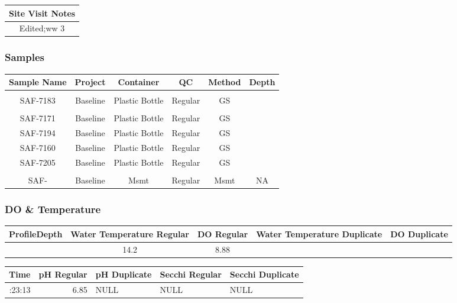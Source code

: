 \documentclass[
  letterpaper,
  DIV=11,
  numbers=noendperiod]{scrartcl}
\begin{document}
\begin{longtable*}{c}
\toprule
Site Visit Notes \\ 
\midrule\addlinespace[2.5pt]
Edited;ww 3 \\ 
\bottomrule
\end{longtable*}

\subsubsection{Samples}

\begin{longtable*}{cccccc}
\toprule
Sample Name & Project & Container & QC & Method & Depth \\ 
\midrule\addlinespace[2.5pt]
 \\ 
\midrule\addlinespace[2.5pt]
SAF-7183 & Baseline & Plastic Bottle & Regular & GS &  \\ 
\midrule\addlinespace[2.5pt]
 \\ 
\midrule\addlinespace[2.5pt]
SAF-7171 & Baseline & Plastic Bottle & Regular & GS &  \\ 
SAF-7194 & Baseline & Plastic Bottle & Regular & GS &  \\ 
SAF-7160 & Baseline & Plastic Bottle & Regular & GS &  \\ 
SAF-7205 & Baseline & Plastic Bottle & Regular & GS &  \\ 
\midrule\addlinespace[2.5pt]
 \\ 
\midrule\addlinespace[2.5pt]
SAF- & Baseline & Msmt & Regular & Msmt & NA \\ 
\bottomrule
\end{longtable*}

\subsubsection{DO \& Temperature}

\begin{longtable*}{rcccc}
\toprule
ProfileDepth & Water Temperature Regular & DO Regular & Water Temperature Duplicate & DO Duplicate \\ 
\midrule{} & 14.2 & 8.88 &  &  \\ 
\bottomrule
\end{longtable*}

\begin{longtable*}{rrlll}
\toprule
Time & pH Regular & pH Duplicate & Secchi Regular & Secchi Duplicate \\ 
\midrule{}:23:13 & 6.85 & NULL & NULL & NULL \\ 
\bottomrule
\end{longtable*}
\end{document}
